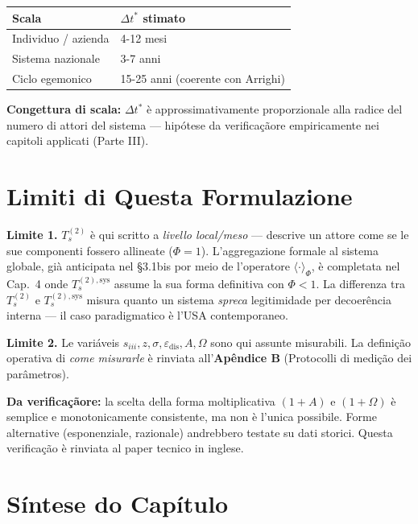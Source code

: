 {\def\LTcaptype{none} %
{\small\begin{longtable}[]{@{}ll@{}}
\toprule\noalign{}
Scala & \(\Delta t^*\) stimato \\
\midrule\noalign{}
\endhead
\bottomrule\noalign{}
\endlastfoot
Individuo / azienda & 4-12 mesi \\
Sistema nazionale & 3-7 anni \\
Ciclo egemonico & 15-25 anni (coerente con Arrighi) \\
\end{longtable}}
}

\Conj{} \textbf{Congettura di scala:} \(\Delta t^*\) è
approssimativamente proporzionale alla radice del numero di attori del
sistema --- hipótese da verificaçãore empiricamente nei capitoli applicati
(Parte III).



\section{Limiti di Questa
Formulazione}\label{limiti-di-questa-formulazione}

\Conj{} \textbf{Limite 1.} \(T_s^{(2)}\) è qui scritto a \emph{livello
local/meso} --- descrive un attore come se le sue componenti fossero
allineate (\(\Phi = 1\)). L'aggregazione formale al sistema globale, già
anticipata nel \S{}3.1bis por meio de l'operatore \(\langle\cdot\rangle_\Phi\),
è completata nel Cap.~4 onde \(T_s^{(2),\text{sys}}\) assume la sua
forma definitiva con \(\Phi < 1\). La differenza tra \(T_s^{(2)}\) e
\(T_s^{(2),\text{sys}}\) misura quanto un sistema \emph{spreca}
legitimidade per decoerência interna --- il caso paradigmatico è l'USA
contemporaneo.

\Conj{} \textbf{Limite 2.} Le variáveis
\(s_{iii}, z, \sigma, \varepsilon_{\text{dis}}, A, \Omega\) sono qui
assunte misurabili. La definição operativa di \emph{come misurarle} è
rinviata all'\textbf{Apêndice B} (Protocolli di medição dei
parâmetros).

\ToVerify{} \textbf{Da verificaçãore:} la scelta della forma moltiplicativa
\((1+A)\) e \((1+\Omega)\) è semplice e monotonicamente consistente, ma
non è l'unica possibile. Forme alternative (esponenziale, razionale)
andrebbero testate su dati storici. Questa verificação è rinviata al paper
tecnico in inglese.



\section{Síntese do Capítulo}\label{sintesi-del-capítulo}

